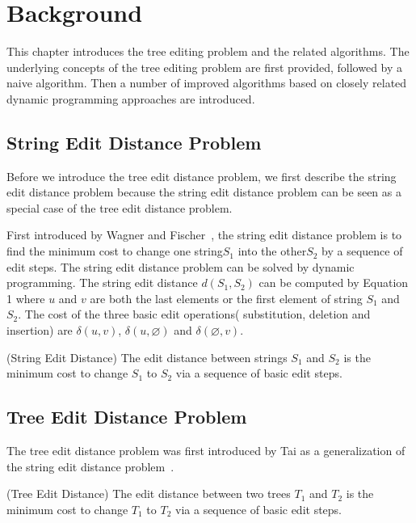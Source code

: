 \doublespacing
\chapter{Background}
This chapter introduces the tree editing problem and the related algorithms. The underlying concepts of the tree editing problem are first provided, followed by a naive algorithm. Then a number of improved algorithms based on closely related dynamic programming approaches are introduced. 

\section{String Edit Distance Problem}
Before we introduce the tree edit distance problem, we first describe the string edit distance problem because the string edit distance problem can be seen as a special case of the tree edit distance problem.

First introduced by Wagner and Fischer~\cite{wagner1974string}, the string edit distance problem is to find the minimum cost to change one string$S_1$ into the other$S_2$ by a sequence of edit steps. The string edit distance problem can be solved by dynamic programming. The string edit distance $d(S_1, S_2)$ can be computed by Equation 1 where $u$ and $v$ are both the last elements or the first element of string $S_1$ and $S_2$. The cost of the three basic edit operations( substitution, deletion and insertion) are $\delta(u, v)$, $\delta(u, \varnothing)$ and $\delta(\varnothing, v)$.

\begin{definition}
(String Edit Distance)
The edit distance between strings $S_1$ and $S_2$ is the minimum cost to change $S_1$ to $S_2$ via a sequence of basic edit steps. 
\end{definition}

\section{Tree Edit Distance Problem}

The tree edit distance problem was first introduced by Tai as a generalization of the string edit distance problem~\cite{wagner1974string}. 

\begin{definition}
(Tree Edit Distance)
The edit distance between two trees $T_1$ and $T_2$ is the minimum cost to change $T_1$ to $T_2$ via a sequence of basic edit steps. 
\end{definition}

